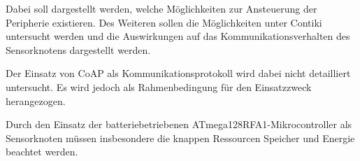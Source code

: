 	Dabei soll dargestellt werden, welche Möglichkeiten zur
	Ansteuerung der Peripherie existieren.	Des Weiteren sollen die
	Möglichkeiten unter Contiki untersucht werden und die Auswirkungen
	auf das Kommunikationsverhalten des Sensorknotens dargestellt werden.

	Der Einsatz von CoAP als Kommunikationsprotokoll wird dabei nicht
	detailliert untersucht. Es wird jedoch als Rahmenbedingung für den
	Einsatzzweck herangezogen.

	Durch den Einsatz der batteriebetriebenen ATmega128RFA1-Mikrocontroller
	als Sensorknoten müssen insbesondere die knappen Ressourcen Speicher und
	Energie beachtet werden.
